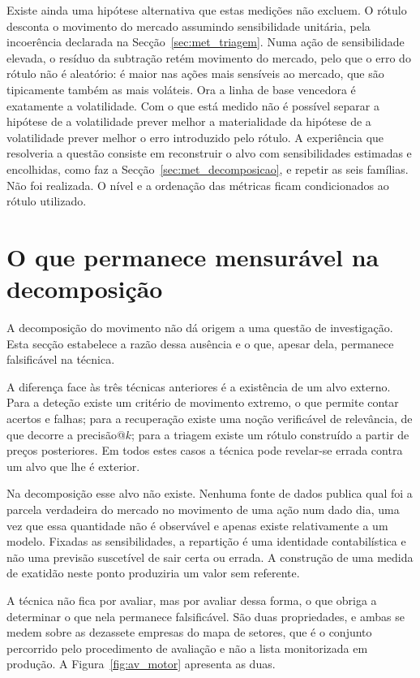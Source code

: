 Existe ainda uma hipótese alternativa que estas medições não excluem. O rótulo desconta o movimento
do mercado assumindo sensibilidade unitária, pela incoerência declarada na
Secção~\ref{sec:met_triagem}. Numa ação de sensibilidade elevada, o resíduo da subtração retém
movimento do mercado, pelo que o erro do rótulo não é aleatório: é maior nas ações mais sensíveis ao
mercado, que são tipicamente também as mais voláteis. Ora a linha de base vencedora é exatamente a
volatilidade. Com o que está medido não é possível separar a hipótese de a volatilidade prever melhor
a materialidade da hipótese de a volatilidade prever melhor o erro introduzido pelo rótulo. A experiência que resolveria a questão consiste em reconstruir o alvo com sensibilidades estimadas
e encolhidas, como faz a Secção~\ref{sec:met_decomposicao}, e repetir as seis famílias. Não foi
realizada. O nível e a ordenação das métricas ficam condicionados ao rótulo utilizado.

\section{O que permanece mensurável na decomposição}
\label{sec:av_decomposicao}

A decomposição do movimento não dá origem a uma questão de investigação. Esta secção estabelece a
razão dessa ausência e o que, apesar dela, permanece falsificável na técnica.

A diferença face às três técnicas anteriores é a existência de um alvo externo. Para a deteção existe
um critério de movimento extremo, o que permite contar acertos e falhas; para a recuperação existe
uma noção verificável de relevância, de que decorre a precisão@$k$; para a triagem existe um rótulo
construído a partir de preços posteriores. Em todos estes casos a técnica pode revelar-se errada
contra um alvo que lhe é exterior.

Na decomposição esse alvo não existe. Nenhuma fonte de dados publica qual foi a parcela verdadeira do
mercado no movimento de uma ação num dado dia, uma vez que essa quantidade não é observável e apenas
existe relativamente a um modelo. Fixadas as sensibilidades, a repartição é uma identidade
contabilística e não uma previsão suscetível de sair certa ou errada. A construção de uma medida de
exatidão neste ponto produziria um valor sem referente.

A técnica não fica por avaliar, mas por avaliar dessa forma, o que obriga a determinar o que nela
permanece falsificável. São duas propriedades, e ambas se medem sobre as dezassete empresas do mapa
de setores, que é o conjunto percorrido pelo procedimento de avaliação e não a lista monitorizada em
produção. A Figura~\ref{fig:av_motor} apresenta as duas.

